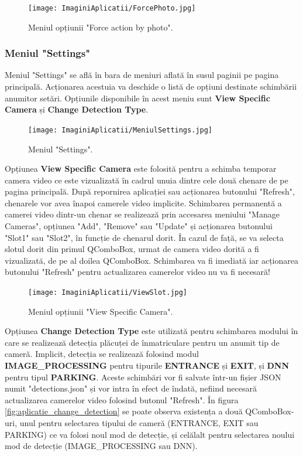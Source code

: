 \documentclass[12pt]{article}
\begin{document}
\begin{figure}[H]
  \centering
  \texttt{[image: ImaginiAplicatii/ForcePhoto.jpg]}
  \caption{Meniul opțiunii "Force action by photo".}
  \label{fig:aplicatie_force_action}
\end{figure}

\subsubsection{Meniul "Settings"}

Meniul "Settings" se afl\u{a} \^{i}n bara de meniuri aflat\u{a} \^{i}n susul paginii pe pagina principal\u{a}. Acționarea acestuia va deschide o list\u{a} de opțiuni destinate schimb\u{a}rii anumitor set\u{a}ri. Opțiunile disponibile \^{i}n acest meniu sunt \textbf{View Specific Camera} și \textbf{Change Detection Type}.

\begin{figure}[H]
  \centering
  \texttt{[image: ImaginiAplicatii/MeniulSettings.jpg]}
  \caption{Meniul "Settings".}
  \label{fig:aplicatie_meniul_settings}
\end{figure}

Opțiunea \textbf{View Specific Camera} este folosit\u{a} pentru a schimba temporar camera video ce este vizualizat\u{a} \^{i}n cadrul unuia dintre cele dou\u{a} chenare de pe pagina principal\u{a}. Dup\u{a} repornirea aplicației sau acționarea butonului "Refresh", chenarele vor avea \^{i}napoi camerele video implicite. Schimbarea permanent\u{a} a camerei video dintr-un chenar se realizeaz\u{a} prin accesarea meniului "Manage Cameras", opțiunea "Add", "Remove" sau "Update" și acționarea butonului "Slot1" sau "Slot2", \^{i}n funcție de chenarul dorit. \^{I}n cazul de faț\u{a}, se va selecta slotul dorit din primul QComboBox, urmat de camera video dorit\u{a} a fi vizualizat\u{a}, de pe al doilea QComboBox. Schimbarea va fi imediat\u{a} iar acționarea butonului "Refresh" pentru actualizarea camerelor video nu va fi necesar\u{a}!

\begin{figure}[H]
  \centering
  \texttt{[image: ImaginiAplicatii/ViewSlot.jpg]}
  \caption{Meniul opțiunii "View Specific Camera".}
  \label{fig:aplicatie_view_slot}
\end{figure}

Opțiunea \textbf{Change Detection Type} este utilizat\u{a} pentru schimbarea modului \^{i}n care se realizeaz\u{a} detecția pl\u{a}cuței de \^{i}nmatriculare pentru un anumit tip de camer\u{a}. Implicit, detecția se realizeaz\u{a} folosind modul \textbf{IMAGE\_PROCESSING} pentru tipurile \textbf{ENTRANCE} și \textbf{EXIT}, și \textbf{DNN} pentru tipul \textbf{PARKING}. Aceste schimb\u{a}ri vor fi salvate \^{i}ntr-un fișier JSON numit "detections.json" și vor intra \^{i}n efect de \^{i}ndat\u{a}, nefiind necesar\u{a} actualizarea camerelor video folosind butonul "Refresh". \^{I}n figura \ref{fig:aplicatie_change_detection} se poate observa existența a dou\u{a} QComboBox-uri, unul pentru selectarea tipului de camer\u{a} (ENTRANCE, EXIT sau PARKING) ce va folosi noul mod de detecție, și cel\u{a}lalt pentru selectarea noului mod de detecție (IMAGE\_PROCESSING sau DNN).
\end{document}
